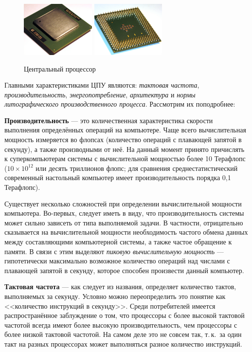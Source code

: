 \begin{figure}[h!]
 \centering
 \includegraphics[width=0.33\textwidth]{base/Introduction/CPUup.jpg}
 \includegraphics[width=0.33\textwidth]{base/Introduction/CPUdown.jpg}
 \label{base:introduction:components:cpu:cpupic}
 \caption{Центральный процессор}
\end{figure}

Главными характеристиками ЦПУ являются: \emph{тактовая частота}, \emph{производительность}, \emph{энергопотребление}, \emph{архитектура} и \emph{нормы литографического производственного процесса}. Рассмотрим их поподробнее:

\textbf{Производительность} --- это количественная характеристика скорости выполнения определённых операций на компьютере.
Чаще всего вычислительная мощность измеряется во флопсах (количество операций с плавающей запятой в секунду), а также производными от неё.
На данный момент принято причислять к суперкомпьютерам системы с вычислительной мощностью более 10 Терафлопс ($10\times10^{12}$ или десять триллионов флопс; для сравнения среднестатистический современный настольный компьютер имеет производительность порядка 0,1 Терафлопс).

Существует несколько сложностей при определении вычислительной мощности компьютера.
Во-первых, следует иметь в виду, что производительность системы может сильно зависеть от типа выполняемой задачи.
В частности, отрицательно сказывается на вычислительной мощности необходимость частого обмена данных между составляющими компьютерной системы, а также частое обращение к памяти.
В связи с этим выделяют \emph{пиковую вычислительную мощность} --- гипотетически максимально возможное количество операций над числами с плавающей запятой в секунду, которое способен произвести данный компьютер.

\textbf{Тактовая частота} --- как следует из названия, определяет количество тактов, выполняемых за секунду. Условно можно переопределить это понятие как <<количество инструкций в секунду>>.
Среди потребителей имеется распространённое заблуждение о том, что процессоры с более высокой тактовой частотой всегда имеют более высокую производительность, чем процессоры с более низкой тактовой частотой.
На самом деле это не совсем так, т.\,к.~за один такт на разных процессорах может выполняться разное количество инструкций.

